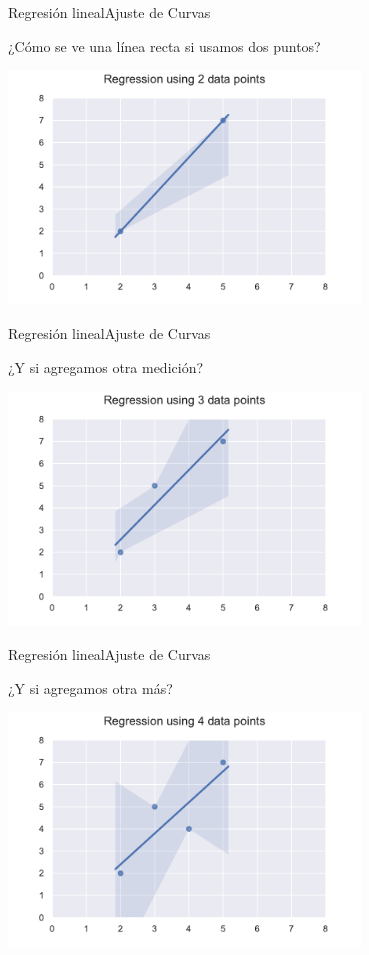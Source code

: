 \documentclass[spanish, c, dvipsnames]{beamer}
\begin{document}
\begin{frame}{Regresión lineal}{Ajuste de Curvas}
    
    ¿Cómo se ve una línea recta si usamos dos puntos? \bigskip

    \begin{center}
        \includegraphics[width=0.7\textwidth]{reg01.pdf}
    \end{center}    

\end{frame}

\begin{frame}{Regresión lineal}{Ajuste de Curvas}
    
    ¿Y si agregamos otra medición? \bigskip

    \begin{center}
        \includegraphics[width=0.7\textwidth]{reg02.pdf}
    \end{center}
\end{frame}

\begin{frame}{Regresión lineal}{Ajuste de Curvas}
    
    ¿Y si agregamos otra más? \bigskip

    \begin{center}
        \includegraphics[width=0.7\textwidth]{reg03.pdf}
    \end{center}
\end{frame}
\end{document}
